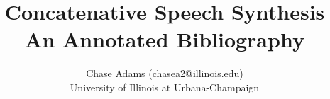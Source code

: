 \documentclass [11pt]{article}
\title{Concatenative Speech Synthesis\\\medskip An Annotated Bibliography}
\author{Chase Adams (chasea2@illinois.edu)\\ University of Illinois at Urbana-Champaign}
\begin{document}
\maketitle
\nocite{*}


\end{document}
